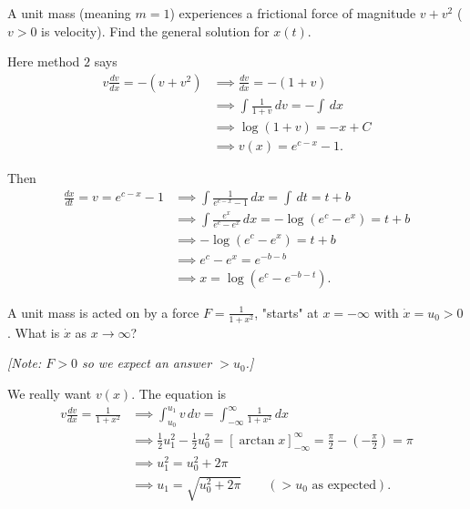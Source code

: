 \documentclass[10pt, a4paper]{article}
\begin{document}
\begin{example}
    A unit mass
    (meaning $m = 1$)
    experiences a frictional force of magnitude $v + v ^ 2$
    ($v > 0$ is velocity).
    Find the general solution for $x(t)$.

    \begin{solution}
        Here method $2$ says
        \begin{align*}
            v\frac{dv}{dx} = -(v + v ^ 2) &\implies \frac{dv}{dx} = -(1 + v) \\
            &\implies \int\frac{1}{1 + v}\,dv = -\int\,dx \\
            &\implies \log(1 + v) = -x + C \\
            &\implies v(x) = e ^ {c - x} - 1.
        \end{align*}

        Then
        \begin{align*}
            \frac{dx}{dt} = v = e ^ {c - x} - 1 &\implies \int\frac{1}{e ^ {c - x} - 1}\,dx = \int\,dt = t + b \\
            &\implies \int\frac{e ^ x}{e ^ c - e ^ x}\,dx = -\log(e ^ c - e ^ x) = t + b \\
            &\implies -\log(e ^ c - e ^ x) = t + b \\
            &\implies e ^ c - e ^ x = e ^ {-b - b} \\
            &\implies x = \log(e ^ c - e ^ {-b - t}).
        \end{align*}
    \end{solution}
\end{example}

\begin{example}
    A unit mass is acted on by a force $F = \frac{1}{1 + x ^ 2}$,
    "starts" at $x = -\infty$ with $\dot{x} = u_0 > 0$.
    What is $\dot{x}$ as $x \rightarrow \infty$?

    \textit{[Note:
    $F > 0$ so we expect an answer $> u_0$.]}
    \begin{solution}
        We really want $v(x)$.
        The equation is
        \begin{align*}
            v\frac{dv}{dx} = \frac{1}{1 + x ^ 2} &\implies \int_{u_0}^{u_1} v\,dv = \int_{-\infty}^{\infty}\frac{1}{1 + x ^ 2}\,dx \\
            &\implies \frac{1}{2}u_1 ^ 2 - \frac{1}{2}u_0 ^ 2 = \left[\arctan{x}\right]_{-\infty}^{\infty} = \frac{\pi}{2} - \left(-\frac{\pi}{2}\right) = \pi \\
            &\implies u_1 ^ 2 = u_0 ^ 2 + 2\pi \\
            &\implies u_1 = \sqrt{u_0 ^ 2 + 2\pi}\qquad(> u_0\text{ as expected}).
        \end{align*}
    \end{solution}
\end{example}
\end{document}
